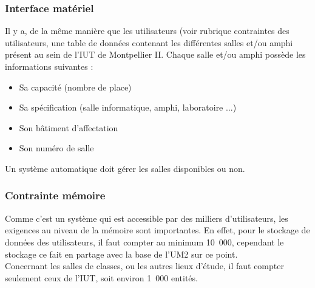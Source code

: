 \documentclass[a4paper, 11pt]{article}
\begin{document}
        \subsubsection{ Interface matériel}
        Il y a, de la même manière que les utilisateurs (voir rubrique contraintes des utilisateurs, une table de données contenant les différentes salles et/ou amphi présent au sein de l'IUT de Montpellier II. Chaque salle et/ou amphi possède les informations suivantes :
        \begin{itemize}
        \item Sa capacité (nombre de place)
        \item Sa spécification (salle informatique, amphi, laboratoire ...)
        \item Son bâtiment d'affectation
        \item Son numéro de salle
        \end{itemize}
Un système automatique doit gérer les salles disponibles ou non.
        \subsubsection{ Contrainte mémoire}
        Comme c'est un système qui est accessible par des milliers d'utilisateurs, les exigences au niveau de la mémoire sont importantes. En effet, pour le stockage de données des utilisateurs, il faut compter au minimum 10~000, cependant le stockage ce fait en partage avec la base de l'UM2 sur ce point. \\Concernant les salles de classes, ou les autres lieux d'étude, il faut compter seulement ceux de l'IUT, soit environ 1~000 entités.
\end{document}
